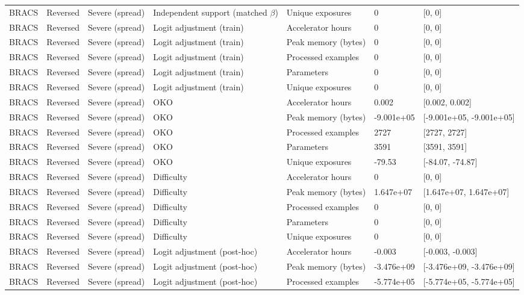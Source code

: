 \begin{longtable}{lllllll}
BRACS & Reversed & Severe (spread) & Independent support (matched $\beta$) & Unique exposures & 0 & [0, 0] \\
BRACS & Reversed & Severe (spread) & Logit adjustment (train) & Accelerator hours & 0 & [0, 0] \\
BRACS & Reversed & Severe (spread) & Logit adjustment (train) & Peak memory (bytes) & 0 & [0, 0] \\
BRACS & Reversed & Severe (spread) & Logit adjustment (train) & Processed examples & 0 & [0, 0] \\
BRACS & Reversed & Severe (spread) & Logit adjustment (train) & Parameters & 0 & [0, 0] \\
BRACS & Reversed & Severe (spread) & Logit adjustment (train) & Unique exposures & 0 & [0, 0] \\
BRACS & Reversed & Severe (spread) & OKO & Accelerator hours & 0.002 & [0.002, 0.002] \\
BRACS & Reversed & Severe (spread) & OKO & Peak memory (bytes) & -9.001e+05 & [-9.001e+05, -9.001e+05] \\
BRACS & Reversed & Severe (spread) & OKO & Processed examples & 2727 & [2727, 2727] \\
BRACS & Reversed & Severe (spread) & OKO & Parameters & 3591 & [3591, 3591] \\
BRACS & Reversed & Severe (spread) & OKO & Unique exposures & -79.53 & [-84.07, -74.87] \\
BRACS & Reversed & Severe (spread) & Difficulty & Accelerator hours & 0 & [0, 0] \\
BRACS & Reversed & Severe (spread) & Difficulty & Peak memory (bytes) & 1.647e+07 & [1.647e+07, 1.647e+07] \\
BRACS & Reversed & Severe (spread) & Difficulty & Processed examples & 0 & [0, 0] \\
BRACS & Reversed & Severe (spread) & Difficulty & Parameters & 0 & [0, 0] \\
BRACS & Reversed & Severe (spread) & Difficulty & Unique exposures & 0 & [0, 0] \\
BRACS & Reversed & Severe (spread) & Logit adjustment (post-hoc) & Accelerator hours & -0.003 & [-0.003, -0.003] \\
BRACS & Reversed & Severe (spread) & Logit adjustment (post-hoc) & Peak memory (bytes) & -3.476e+09 & [-3.476e+09, -3.476e+09] \\
BRACS & Reversed & Severe (spread) & Logit adjustment (post-hoc) & Processed examples & -5.774e+05 & [-5.774e+05, -5.774e+05] \\

\end{longtable}
